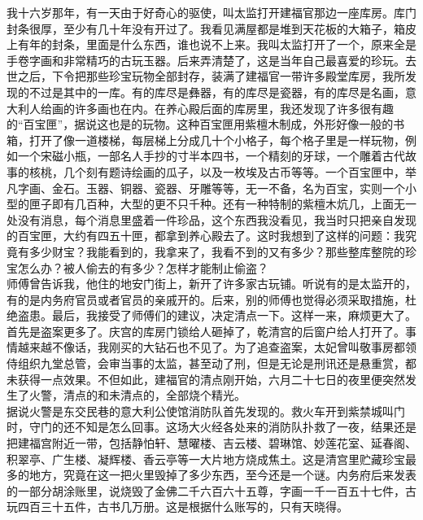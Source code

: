 我十六岁那年，有一天由于好奇心的驱使，叫太监打开建福官那边一座库房。库门封条很厚，至少有几十年没有开过了。我看见满屋都是堆到天花板的大箱子，箱皮上有年的封条，里面是什么东西，谁也说不上来。我叫太监打开了一个，原来全是手卷字画和非常精巧的古玩玉器。后来弄清楚了，这是当年自己最喜爱的珍玩。去世之后，下令把那些珍宝玩物全部封存，装满了建福官一带许多殿堂库房，我所发现的不过是其中的一库。有的库尽是彝器，有的库尽是瓷器，有的库尽是名画，意大利人给画的许多画也在内。在养心殿后面的库房里，我还发现了许多很有趣的“百宝匣”，据说这也是的玩物。这种百宝匣用紫檀木制成，外形好像一般的书箱，打开了像一道楼梯，每层梯上分成几十个小格子，每个格子里是一样玩物，例如一个宋磁小瓶，一部名人手抄的寸半本四书，一个精刻的牙球，一个雕着古代故事的核桃，几个刻有题诗绘画的瓜子，以及一枚埃及古币等等。一个百宝匣中，举凡字画、金石。玉器、铜器、瓷器、牙雕等等，无一不备，名为百宝，实则一个小型的匣子即有几百种，大型的更不只千种。还有一种特制的紫檀木炕几，上面无一处没有消息，每个消息里盛着一件珍品，这个东西我没看见，我当时只把亲自发现的百宝匣，大约有四五十匣，都拿到养心殿去了。这时我想到了这样的问题：我究竟有多少财宝？我能看到的，我拿来了，我看不到的又有多少？那些整库整院的珍宝怎么办？被人偷去的有多少？怎样才能制止偷盗？\\

师傅曾告诉我，他住的地安门街上，新开了许多家古玩铺。听说有的是太监开的，有的是内务府官员或者官员的亲戚开的。后来，别的师傅也觉得必须采取措施，杜绝盗患。最后，我接受了师傅们的建议，决定清点一下。这样一来，麻烦更大了。\\

首先是盗案更多了。庆宫的库房门锁给人砸掉了，乾清宫的后窗户给人打开了。事情越来越不像话，我刚买的大钻石也不见了。为了追查盗案，太妃曾叫敬事房都领侍组织九堂总管，会审当事的太监，甚至动了刑，但是无论是刑讯还是悬重赏，都未获得一点效果。不但如此，建福官的清点刚开始，六月二十七日的夜里便突然发生了火警，清点的和未清点的，全部烧个精光。\\

据说火警是东交民巷的意大利公使馆消防队首先发现的。救火车开到紫禁城叫门时，守门的还不知是怎么回事。这场大火经各处来的消防队扑救了一夜，结果还是把建福宫附近一带，包括静怕轩、慧曜楼、吉云楼、碧琳馆、妙莲花室、延春阁、积翠亭、广生楼、凝辉楼、香云亭等一大片地方烧成焦土。这是清宫里贮藏珍宝最多的地方，究竟在这一把火里毁掉了多少东西，至今还是一个谜。内务府后来发表的一部分胡涂账里，说烧毁了金佛二千六百六十五尊，字画一千一百五十七件，古玩四百三十五件，古书几万册。这是根据什么账写的，只有天晓得。\\

